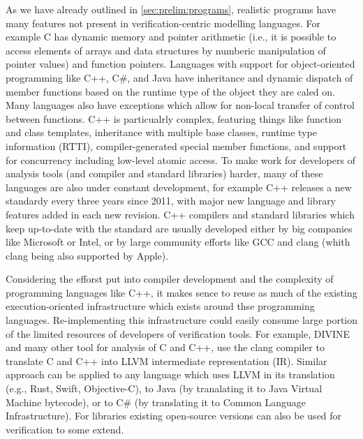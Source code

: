 As we have already outlined in \autoref{sec:prelim:programs}, realistic
programs have many features not present in verification-centric modelling
languages.
For example C has dynamic memory and pointer arithmetic (i.e., it is possible
to access elements of arrays and data structures by numberic manipulation of
pointer values) and function pointers.
Languages with support for object-oriented programming like C++, C\#, and Java
have inheritance and dynamic dispatch of member functions based on the runtime
type of the object they are caled on.
Many languages also have exceptions which allow for non-local transfer of
control between functions.
C++ is particualrly complex, featuring things like function and class
templates,
inheritance with multiple base classes, runtime type information (RTTI),
compiler-generated special member functions,
and support for concurrency including low-level atomic access.
To make work for developers of analysis tools (and compiler and standard
libraries) harder, many of these languages are also under constant development,
for example C++ releases a new standardy every three years since 2011, with
major new language and library features added in each new revision.
C++ compilers and standard libraries which keep up-to-date with the standard
are usually developed either by big companies like Microsoft or Intel, or by
large community efforts like GCC and clang (whith clang being also supported by
Apple).

Considering the efforst put into compiler development and the complexity of
programming languages like C++, it makes sence to reuse as much of the existing
execution-oriented infrastructure which exists around thse programming
languages.
Re-implementing this infrastructure could easily consume large portion of the
limited resources of developers of verification tools.
For example, DIVINE and many other tool for analysis of C and C++, use the
clang compiler to translate C and C++ into LLVM intermediate representation
(IR).
Similar approach can be applied to any language which uses LLVM in its
translation (e.g., Rust, Swift, Objective-C), to Java (by tranalating it to
Java Virtual Machine bytecode), or to C\# (by translating it to Common Language
Infrastructure).
For libraries existing open-source versions can also be used for verification to some extend.

